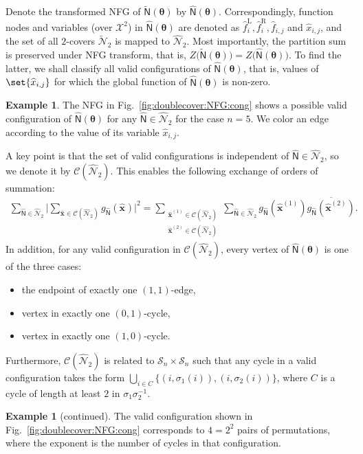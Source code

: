 \documentclass[conference]{IEEEtran}
\theoremstyle{plain}
\theoremstyle{definition}
\newtheorem{example}[thm]{Example}
\newcommand{\sfn}{\mathsf{N}}
\newcommand{\hatfr}[1]{\widehat{f}^{\mathrm{R}}_{ #1 }}
\newcommand{\hatfl}[1]{\widehat{f}^{\mathrm{L}}_{ #1 }}
\newcommand{\hatx}[1]{\widehat{x}_{ #1 }}
\newcommand{\hatbfx}[1][]{\widehat{\mathbf{x}}^{ #1 }}
\newcommand{\btheta}{\boldsymbol{\theta}}
\newcommand{\validc}{\mathcal {C}(\widehat{\mathcal N}_2)}
\begin{document}

Denote the transformed NFG of $\widetilde{\sfn}(\btheta)$ by
$\widehat{\sfn}(\btheta)$. Correspondingly, function nodes and variables (over
$\mathcal X^2$) in $\widehat{\sfn}(\btheta)$ are denoted as
$\hatfl{i},\hatfr{i},\widehat{f}_{i,j}$ and $\hatx{i,j}$, and the set of all
$2$-covers $\widetilde{\mathcal N}_2$ is mapped to $\widehat{\mathcal N}_2$.
Most importantly, the partition sum is preserved under NFG transform, that is,
$Z\bigl( \widetilde{\sfn}(\btheta) \bigr) = Z\bigl( \widehat{\sfn}(\btheta)
\bigr)$. To find the latter, we shall classify all valid configurations of
$\widehat{\sfn}(\btheta)$, that is, values of $\set{\hatx{i,j}}$ for which the
global function of $\widehat{\sfn}(\btheta)$ is non-zero.


\begin{example}
 The NFG in Fig.~\ref{fig:doublecover:NFG:cong} shows a possible valid
 configuration of $\widehat{\sfn}(\btheta)$ for any
 $\widehat{\sfn}\in\widehat{\mathcal N}_2$ for the case $n=5$. We color an
 edge according to the value of its variable $\hatx{i,j}$.
\end{example}


A key point is that the set of valid configurations is independent of
$\widehat{\sfn}\in\widehat{\mathcal N}_2$, so we denote it by $\validc$. This
enables the following exchange of orders of summation:
\begin{align*}
 \sum_{\widehat{\sfn}\in\widehat{\mathcal N}_2}\Biggl\vert
 \sum_{\hatbfx \in \validc}
 g_{\widehat{\sfn}}(\hatbfx)\Biggr\vert^2
 =\sum_{\substack{\hatbfx[(1)]\in \validc \\\hatbfx[(2)]\in \validc}}
 \sum_{\widehat{\sfn}\in\widehat{\mathcal N}_2}
 g_{\widehat{\sfn}}(\hatbfx[(1)])\overline{g_{\widehat{\sfn}}(\hatbfx[(2)])}.
\end{align*}
In addition, for any valid configuration in
$\validc$, every vertex of
$\widehat{\sfn}(\btheta)$ is one of the three cases:
\begin{itemize}
 \item the endpoint of exactly one $(1,1)$-edge,
 \item vertex in exactly one $(0,1)$-cycle,
 \item vertex in exactly one $(1,0)$-cycle.
\end{itemize}
Furthermore, $\validc$ is related to
$\mathcal{S}_n\times \mathcal{S}_n$ such that any cycle in a valid configuration takes the form
$\bigcup_{i\in C}\bigl\{ (i,\sigma_1(i)),(i,\sigma_2(i)) \bigr\}$, where $C$
is a cycle of length at least $2$ in $\sigma_{1}\sigma_2^{-1}$.
\addtocounter{thm}{-1}
\begin{example} [continued]
 The valid configuration shown in Fig.~\ref{fig:doublecover:NFG:cong} corresponds to
 $4=2^2$ pairs of permutations, where the exponent is the number of cycles in that configuration.
\end{example}
\end{document}

